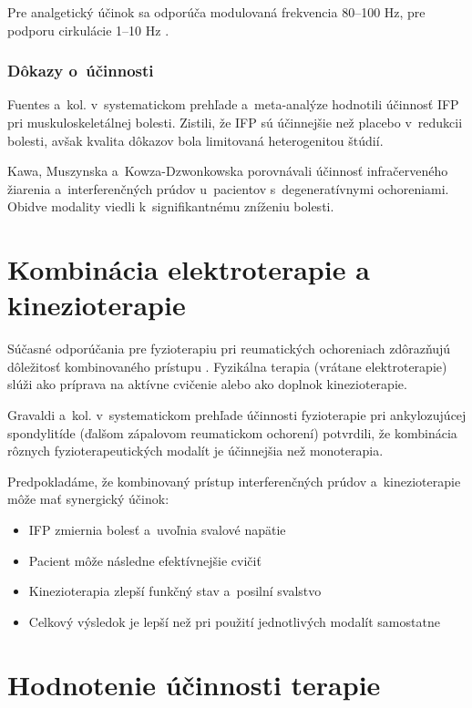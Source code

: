 Pre analgetický účinok sa odporúča modulovaná frekvencia 80--100 Hz, pre podporu cirkulácie 1--10 Hz \parencite{Podebradsky2009}.

\subsubsection{Dôkazy o~účinnosti}

Fuentes a~kol. \parencite*{fuentes2010} v~systematickom prehľade a~meta-analýze hodnotili účinnosť IFP pri muskuloskeletálnej bolesti. Zistili, že IFP sú účinnejšie než placebo v~redukcii bolesti, avšak kvalita dôkazov bola limitovaná heterogenitou štúdií.

Kawa, Muszynska a~Kowza-Dzwonkowska \parencite*{Kawa2014} porovnávali účinnosť infračerveného žiarenia a~interferenčných prúdov u~pacientov s~degeneratívnymi ochoreniami. Obidve modality viedli k~signifikantnému zníženiu bolesti.

\section{Kombinácia elektroterapie a kinezioterapie}

Súčasné odporúčania pre fyzioterapiu pri reumatických ochoreniach zdôrazňujú dôležitosť kombinovaného prístupu \parencite{Herbert2022}. Fyzikálna terapia (vrátane elektroterapie) slúži ako príprava na aktívne cvičenie alebo ako doplnok kinezioterapie.

Gravaldi a~kol. \parencite*{Gravaldi2022} v~systematickom prehľade účinnosti fyzioterapie pri ankylozujúcej spondylitíde (ďalšom zápalovom reumatickom ochorení) potvrdili, že kombinácia rôznych fyzioterapeutických modalít je účinnejšia než monoterapia.

Predpokladáme, že kombinovaný prístup interferenčných prúdov a~kinezioterapie môže mať synergický účinok:
\begin{itemize}
    \item IFP zmiernia bolesť a~uvoľnia svalové napätie
    \item Pacient môže následne efektívnejšie cvičiť
    \item Kinezioterapia zlepší funkčný stav a~posilní svalstvo
    \item Celkový výsledok je lepší než pri použití jednotlivých modalít samostatne
\end{itemize}

\section{Hodnotenie účinnosti terapie}

